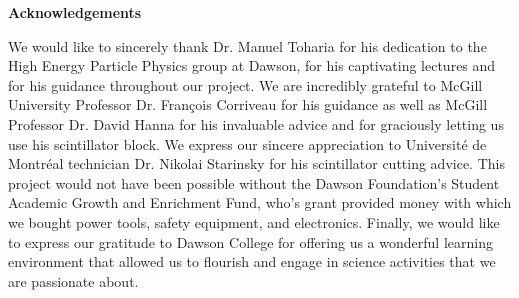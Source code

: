 \begin{center}
    \textbf{Acknowledgements}
\end{center}

We would like to sincerely thank Dr. Manuel Toharia for his dedication to the High Energy Particle Physics group at Dawson, for his captivating lectures and for his guidance throughout our project. We are incredibly grateful to McGill University Professor Dr. François Corriveau for his guidance as well as McGill Professor Dr. David Hanna for his invaluable advice and for graciously letting us use his scintillator block. We express our sincere appreciation to Université de Montréal technician Dr. Nikolai Starinsky for his scintillator cutting advice. This project would not have been possible without the Dawson Foundation’s Student Academic Growth and Enrichment Fund, who’s grant provided money with which we bought power tools, safety equipment, and electronics. Finally, we would like to express our gratitude to Dawson College for offering us a wonderful learning environment that allowed us to flourish and engage in science activities that we are passionate about. 
